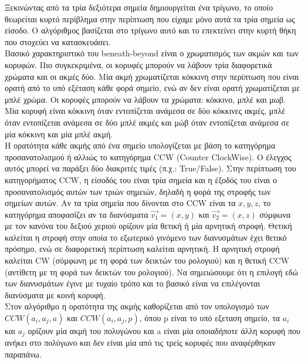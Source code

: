 \documentclass[oneside,12pt]{book}
\theoremstyle{definition}
\begin{document}
Ξεκινώντας από τα τρία δεξιότερα σημεία δημιουργείται ένα τρίγωνο, το οποίο θεωρείται κυρτό περίβλημα στην περίπτωση που είχαμε μόνο αυτά τα τρία σημεία ως είσοδο. Ο αλγόριθμος βασίζεται στο τρίγωνο αυτό και το επεκτείνει στην κυρτή θήκη που στοχεύει να κατασκευάσει. \\

Βασικό χαρακτηριστικό του beneath-beyond είναι ο χρωματισμός των ακμών και των κορυφών. Πιο συγκεκριμένα, οι κορυφές μπορούν να λάβουν τρία διαφορετικά χρώματα και οι ακμές δύο. Μία ακμή χρωματίζεται κόκκινη στην περίπτωση που είναι ορατή από το υπό εξέταση κάθε φορά σημείο, ενώ αν δεν είναι ορατή χρωματίζεται με μπλέ χρώμα. Οι κορυφές μπορούν να λάβουν τα χρώματα: κόκκινο, μπλέ και μωβ. Μία κορυφή είναι κόκκινη όταν εντοπίζεται ανάμεσα σε δύο κόκκινες ακμές, μπλέ όταν εντοπίζεται ανάμεσα σε δύο μπλέ ακμές και μώβ όταν εντοπίζεται ανάμεσα σε μία κόκκινη και μία μπλέ ακμή. \\

Η ορατότητα κάθε ακμής από ένα σημείο υπολογίζεται με βάση το κατηγόρημα προσανατολισμού ή αλλιώς το κατηγόρημα CCW (Counter ClockWise). Ο έλεγχος αυτός μπορεί να παράξει δύο διακριτές τιμές (π.χ.: True/False). Στην περίπτωση του κατηγορήματος CCW, η είσοδός του είναι τρία σημεία και η έξοδός του είναι ο προσανατολισμός αυτών των τριών σημειών, δηλαδή η φορά της στροφής των σημείων αυτών. Αν τα τρία σημεία που δίνονται στο CCW είναι τα \(x,y,z\), το κατηγόρημα αποφασίζει αν τα διανύσματα \(\vec{v_1} = (x,y)\) και \(\vec{v_2} = (x,z)\) σύμφωνα με τον κανόνα του δεξιού χεριού ορίζουν μία θετική ή μία αρνητική στροφή. Θετική καλείται η στροφή στην οποία το εξωτερικό γινόμενο των διανυσμάτων έχει θετικό πρόσημο, ενώ σε διαφορετική περίπτωση καλείται αρνητική. Η αρνητική στροφή καλείται CW (σύμφωνη με τη φορά των δεικτών του ρολογιού) και η θετική CCW (αντίθετη με τη φορά των δεικτών του ρολογιού). Να σημειώσουμε ότι η επιλογή εδώ των διανυσμάτων έγινε με τυχαίο τρόπο και το βασικό είναι να επιλέγονται διανύσματα με κοινή κορυφή. \\

Στον αλγόριθμο η ορατότητα της ακμής καθορίζεται από τον υπολογισμό των \(CCW(a_i, a_j, a)\) και \(CCW(a_i, a_j, p)\), όπου p είναι το υπό εξεταση σημείο, τα \(a_i\) και \(a_j\) ορίζουν μία ακμή του πολυγώνου και a είναι μία οποιαδήποτε άλλη κορυφή που ανήκει στο πολύγωνο και δεν είναι μία από τις τρείς κορυφές που αναφέρθηκαν παραπάνω. \\
\end{document}
